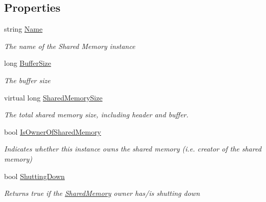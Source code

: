 \subsection*{Properties}
\begin{DoxyCompactItemize}
\item 
string \hyperlink{class_shared_memory_1_1_shared_buffer_ada2e0253ecaba264da7f2855a02e9ccc}{Name}
\begin{DoxyCompactList}\small\item\em The name of the Shared Memory instance \end{DoxyCompactList}\item 
long \hyperlink{class_shared_memory_1_1_shared_buffer_a3f349a666f907c724a876c52c5fd63e9}{Buffer\+Size}
\begin{DoxyCompactList}\small\item\em The buffer size \end{DoxyCompactList}\item 
virtual long \hyperlink{class_shared_memory_1_1_shared_buffer_a733b9a53bf913e22a6b97334ffe054dc}{Shared\+Memory\+Size}
\begin{DoxyCompactList}\small\item\em The total shared memory size, including header and buffer. \end{DoxyCompactList}\item 
bool \hyperlink{class_shared_memory_1_1_shared_buffer_a3cd1658c35b0a9234faf1e65eba5088e}{Is\+Owner\+Of\+Shared\+Memory}
\begin{DoxyCompactList}\small\item\em Indicates whether this instance owns the shared memory (i.\+e. creator of the shared memory) \end{DoxyCompactList}\item 
bool \hyperlink{class_shared_memory_1_1_shared_buffer_a598ee38e06ba63929f51946963694b72}{Shutting\+Down}
\begin{DoxyCompactList}\small\item\em Returns true if the \hyperlink{namespace_shared_memory}{Shared\+Memory} owner has/is shutting down \end{DoxyCompactList}\item 

\end{DoxyCompactItemize}
